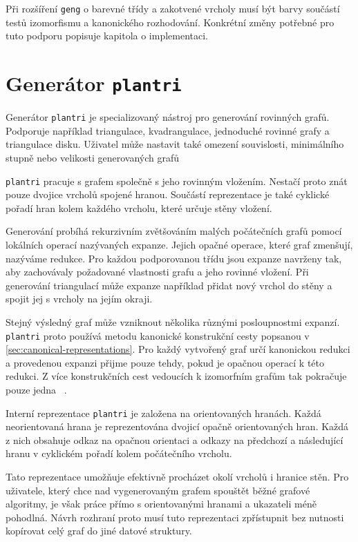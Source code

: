 Při rozšíření \texttt{geng} o barevné třídy a zakotvené vrcholy musí být barvy
součástí testů izomorfismu a kanonického rozhodování. Konkrétní změny potřebné
pro tuto podporu popisuje kapitola o implementaci.


\section{Generátor \texttt{plantri}}
\label{sec:plantri}

Generátor \texttt{plantri} je specializovaný nástroj pro generování rovinných
grafů. Podporuje například triangulace, kvadrangulace, jednoduché rovinné
grafy a triangulace disku. Uživatel může nastavit také omezení souvislosti,
minimálního stupně nebo velikosti generovaných grafů


\texttt{plantri} pracuje s grafem společně s jeho rovinným vložením. Nestačí
proto znát pouze dvojice vrcholů spojené hranou. Součástí reprezentace je také
cyklické pořadí hran kolem každého vrcholu, které určuje stěny vložení.

Generování probíhá rekurzivním zvětšováním malých počátečních grafů pomocí
lokálních operací nazývaných expanze. Jejich opačné operace, které graf
zmenšují, nazýváme redukce. Pro každou podporovanou třídu jsou expanze
navrženy tak, aby zachovávaly požadované vlastnosti grafu a jeho rovinné
vložení. Při generování triangulací může expanze například přidat nový vrchol
do stěny a spojit jej s vrcholy na jejím okraji.

Stejný výsledný graf může vzniknout několika různými posloupnostmi expanzí.
\texttt{plantri} proto používá metodu kanonické konstrukční cesty popsanou
v \cref{sec:canonical-representations}. Pro každý vytvořený graf určí
kanonickou redukci a provedenou expanzi přijme pouze tehdy, pokud je opačnou
operací k této redukci. Z více konstrukčních cest vedoucích k izomorfním
grafům tak pokračuje pouze jedna
~\cite[Section~1.2]{brinkmann2007fast}.

Interní reprezentace \texttt{plantri} je založena na orientovaných hranách.
Každá neorientovaná hrana je reprezentována dvojicí opačně orientovaných hran.
Každá z nich obsahuje odkaz na opačnou orientaci a odkazy na předchozí a
následující hranu v cyklickém pořadí kolem počátečního vrcholu.

Tato reprezentace umožňuje efektivně procházet okolí vrcholů i hranice stěn.
Pro uživatele, který chce nad vygenerovaným grafem spouštět běžné grafové
algoritmy, je však práce přímo s orientovanými hranami a ukazateli méně
pohodlná. Návrh rozhraní proto musí tuto reprezentaci zpřístupnit bez nutnosti
kopírovat celý graf do jiné datové struktury.



